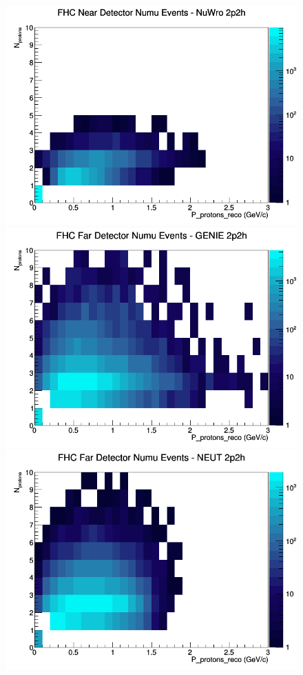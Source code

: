 \begin{figure}[h]
\includegraphics[width=\linewidth]{eff_N_P/FGT/protons/2p2h_FHC_ND_numu_N_P_NuWro.png}
\endminipage
\newline
{}
\includegraphics[width=\linewidth]{eff_N_P/FGT/protons/2p2h_FHC_FD_numu_N_P_GENIE.png}
\endminipage
{}
\includegraphics[width=\linewidth]{eff_N_P/FGT/protons/2p2h_FHC_FD_numu_N_P_NEUT.png}

\end{figure}
